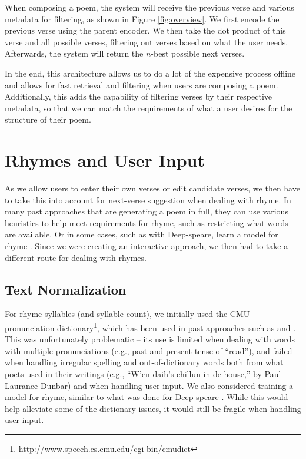 \documentclass[11pt]{article}
\begin{document}
When composing a poem, the system will receive the previous verse and various metadata for filtering, as shown in Figure \ref{fig:overview}.
We first encode the previous verse using the parent encoder.
We then take the dot product of this verse and all possible verses, filtering out verses based on what the user needs.
Afterwards, the system will return the $n$-best possible next verses.

In the end, this architecture allows us to do a lot of the expensive process offline and allows for fast retrieval and filtering when users are composing a poem.
Additionally, this adds the capability of filtering verses by their respective metadata, so that we can match the requirements of what a user desires for the structure of their poem.

\section{Rhymes and User Input}\label{rhymes}

As we allow users to enter their own verses or edit candidate verses, we then have to take this into account for next-verse suggestion when dealing with rhyme.
In many past approaches that are generating a poem in full, they can use various heuristics to help meet requirements for rhyme, such as restricting what words are available.
Or in some cases, such as with Deep-speare, learn a model for rhyme \cite{lau2018}.
Since we were creating an interactive approach, we then had to take a different route for dealing with rhymes.

\subsection{Text Normalization}\label{phonemes}

For rhyme syllables (and syllable count), we initially used the CMU pronunciation dictionary\footnote{http://www.speech.cs.cmu.edu/cgi-bin/cmudict}, which has been used in past approaches such as \citet{ghazvininejad2016} and \citet{hopkins2017}.
This was unfortunately problematic -- its use is limited when dealing with words with multiple pronunciations (e.g., past and present tense of ``read''), and failed when handling irregular spelling and out-of-dictionary words both from what poets used in their writings (e.g., ``W'en daih's chillun in de house,'' by Paul Laurance Dunbar) and when handling user input.
We also considered training a model for rhyme, similar to what was done for Deep-speare \cite{lau2018}.
While this would help alleviate some of the dictionary issues, it would still be fragile when handling user input. 
\end{document}
